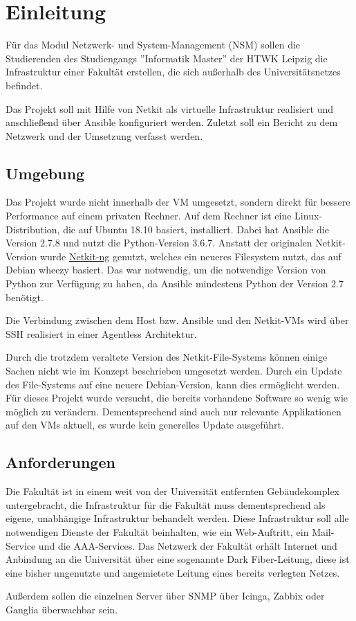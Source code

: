 \chapter{Einleitung}

Für das Modul Netzwerk- und System-Management (NSM) sollen die Studierenden des Studiengangs ''Informatik Master'' der HTWK Leipzig die Infrastruktur einer Fakultät erstellen, die sich außerhalb des Universitätsnetzes befindet.

Das Projekt soll mit Hilfe von Netkit als virtuelle Infrastruktur realisiert und anschließend über Ansible konfiguriert werden. Zuletzt soll ein Bericht zu dem Netzwerk und der Umsetzung verfasst werden.

\section{Umgebung}

Das Projekt wurde nicht innerhalb der VM umgesetzt, sondern direkt für bessere Performance auf einem privaten Rechner. Auf dem Rechner ist eine Linux-Distribution, die auf Ubuntu 18.10 basiert, installiert. Dabei hat Ansible die Version 2.7.8 und nutzt die Python-Version 3.6.7. Anstatt der originalen Netkit-Version wurde \href{https://netkit-ng.github.io/}{Netkit-ng} genutzt, welches ein neueres Filesystem nutzt, das auf Debian wheezy basiert. Das war notwendig, um die notwendige Version von Python zur Verfügung zu haben, da Ansible mindestens Python der Version 2.7 benötigt.

Die Verbindung zwischen dem Host bzw. Ansible und den Netkit-VMs wird über SSH realisiert in einer Agentless Architektur.

Durch die trotzdem veraltete Version des Netkit-File-Systems können einige Sachen nicht wie im Konzept beschrieben umgesetzt werden. Durch ein Update des File-Systems auf eine neuere Debian-Version, kann dies ermöglicht werden. Für dieses Projekt wurde versucht, die bereits vorhandene Software so wenig wie möglich zu verändern. Dementsprechend sind auch nur relevante Applikationen auf den VMs aktuell, es wurde kein generelles Update ausgeführt.

\section{Anforderungen}
Die Fakultät ist in einem weit von der Universität entfernten Gebäudekomplex untergebracht, die Infrastruktur für die Fakultät muss dementsprechend als eigene, unabhängige Infrastruktur behandelt werden. Diese Infrastruktur soll alle notwendigen Dienste der Fakultät beinhalten, wie ein Web-Auftritt, ein Mail-Service und die AAA-Services.
Das Netzwerk der Fakultät erhält Internet und Anbindung an die Universität über eine sogenannte Dark Fiber-Leitung, diese ist eine bisher ungenutzte und angemietete Leitung eines bereits verlegten Netzes.

Außerdem sollen die einzelnen Server über SNMP über Icinga, Zabbix oder Ganglia überwachbar sein.